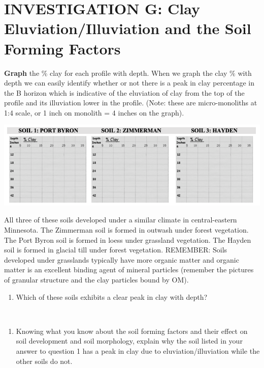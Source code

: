 \documentclass[
  letterpaper,
  twocolumn,
  portrait]{scrbook}
\providecommand{\tightlist}{%
  \setlength{\itemsep}{0pt}\setlength{\parskip}{0pt}}\usepackage{longtable,booktabs,array}
\begin{document}
\hypertarget{investigation-g-clay-eluviationilluviation-and-the-soil-forming-factors}{%
\section{INVESTIGATION G: Clay Eluviation/Illuviation and the Soil
Forming
Factors}\label{investigation-g-clay-eluviationilluviation-and-the-soil-forming-factors}}

\textbf{Graph} the \% clay for each profile with depth. When we graph
the clay \% with depth we can easily identify whether or not there is a
peak in clay percentage in the B horizon which is indicative of the
eluviation of clay from the top of the profile and its illuviation lower
in the profile. (Note: these are micro-monoliths at 1:4 scale, or 1 inch
on monolith = 4 inches on the graph).

\includegraphics{clay-eluviation-illuviation-graph.png}

All three of these soils developed under a similar climate in
central-eastern Minnesota. The Zimmerman soil is formed in outwash under
forest vegetation. The Port Byron soil is formed in loess under
grassland vegetation. The Hayden soil is formed in glacial till under
forest vegetation. REMEMBER: Soils developed under grasslands typically
have more organic matter and organic matter is an excellent binding
agent of mineral particles (remember the pictures of granular structure
and the clay particles bound by OM).

\begin{enumerate}
\def\labelenumi{\arabic{enumi}.}
\tightlist
\item
  Which of these soils exhibits a clear peak in clay with depth?
\end{enumerate}

~ ~ ~

\begin{enumerate}
\def\labelenumi{\arabic{enumi}.}
\setcounter{enumi}{1}
\tightlist
\item
  Knowing what you know about the soil forming factors and their effect
  on soil development and soil morphology, explain why the soil listed
  in your answer to question 1 has a peak in clay due to
  eluviation/illuviation while the other soils do not.
\end{enumerate}
\end{document}
